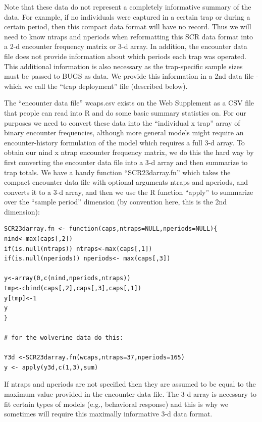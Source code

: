 Note that these data do not represent a completely informative summary of the data. For example, if no individuals were captured in a certain trap or during a certain period, then this compact data format will have no record. Thus we will need to know ntraps and nperiods when reformatting this SCR data format into a 2-d encounter frequency matrix or 3-d array. In addition, the encounter data file does not provide information about which periods each trap was operated. This additional information is also necessary as the trap-specific sample sizes must be passed to BUGS as data. We provide this information in a 2nd data file - which we call the ``trap deployment'' file (described below).

The ``encounter data file'' wcaps.csv exists on the Web Supplement as a CSV file that people can read into R and do some basic summary statistics on. For our purposes we need to convert these data into the ``individual x trap'' array of binary encounter frequencies, although more general models might require an encounter-history formulation of the model which requires a full 3-d array.  To obtain our nind x ntrap encounter frequency matrix, we do this the hard way by first converting the encounter data file into a 3-d array and then summarize to trap totals. We have a handy function ``SCR23darray.fn'' which takes the compact encounter data file with optional arguments ntraps and nperiods, and converts it to a 3-d array, and then we use the R function ``apply'' to summarize over the ``sample period'' dimension (by convention here, this is the 2nd dimension):

\begin{verbatim}
SCR23darray.fn <- function(caps,ntraps=NULL,nperiods=NULL){
nind<-max(caps[,2])
if(is.null(ntraps)) ntraps<-max(caps[,1])
if(is.null(nperiods)) nperiods<- max(caps[,3])

y<-array(0,c(nind,nperiods,ntraps))
tmp<-cbind(caps[,2],caps[,3],caps[,1])
y[tmp]<-1
y
}

# for the wolverine data do this:

Y3d <-SCR23darray.fn(wcaps,ntraps=37,nperiods=165)
y <- apply(y3d,c(1,3),sum)
\end{verbatim}

If ntraps and nperiods are not specified then they are assumed to be equal to the maximum value provided in the encounter data file.  The 3-d array is necessary to fit certain types of models (e.g., behavioral response) and this is why we sometimes will require this maximally informative 3-d data format.

